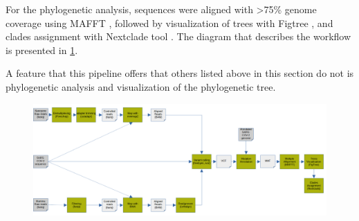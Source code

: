         For the phylogenetic analysis, sequences were aligned with >75\% genome coverage using MAFFT \cite{mafft}, followed by visualization of trees with Figtree \cite{figtree}, and clades assignment with Nextclade tool \cite{nextclade2022}. The diagram that describes the workflow is presented in \cref{fig:prior:izquierdo}.
        
        A feature that this pipeline offers that others listed above in this section do not is phylogenetic analysis and visualization of the phylogenetic tree.
        \begin{landscape}
        \centering\vspace*{\fill}
        \begin{figure}[ht!]
        	\centering
            \includegraphics[width=1.4\textwidth]{figures/prior/Izquierdo-Lara.png}
            \label{fig:prior:izquierdo}
        \end{figure}
        \vfill
        \end{landscape}
        
        
